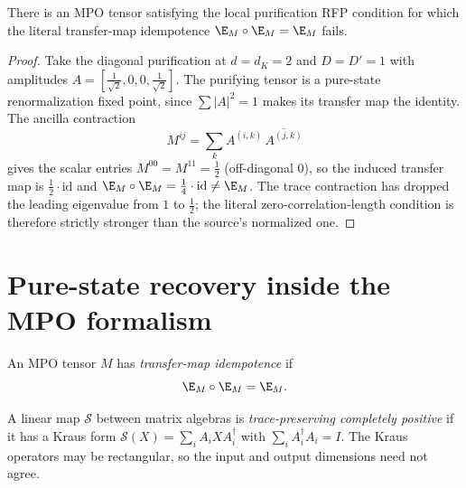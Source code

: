 \begin{theorem}
    \label{thm:local_purification_rfp_not_zcl}
    \leanok
    There is an MPO tensor satisfying the local purification RFP condition for
    which the literal transfer-map idempotence $\E_M\circ\E_M=\E_M$ fails.
\end{theorem}

\begin{proof}\leanok
    Take the diagonal purification at $d=d_K=2$ and $D=D'=1$ with amplitudes
    $A=[\tfrac{1}{\sqrt2},0,0,\tfrac{1}{\sqrt2}]$. The purifying tensor is a
    pure-state renormalization fixed point, since $\sum|A|^2=1$ makes its transfer
    map the identity. The ancilla contraction
    \[
        M^{ij}=\sum_k A^{(i,k)}\,\overline{A^{(j,k)}}
    \]
    gives the scalar entries $M^{00}=M^{11}=\tfrac12$ (off-diagonal $0$), so the
    induced transfer map is $\tfrac12\cdot\mathrm{id}$ and
    $\E_M\circ\E_M=\tfrac14\cdot\mathrm{id}\neq\E_M$. The trace contraction has
    dropped the leading eigenvalue from $1$ to $\tfrac12$; the literal
    zero-correlation-length condition is therefore strictly stronger than the
    source's normalized one.
\end{proof}

\section{Pure-state recovery inside the MPO formalism}

\begin{definition}\label{def:is_rfp_mpdo}
    \leanok
    An MPO tensor $M$ has \emph{transfer-map idempotence} if
    \[
        \E_M \circ \E_M = \E_M.
    \]
\end{definition}


\begin{definition}
    \label{def:is_kraus_cptp}
    \leanok
    A linear map $\mathcal{S}$ between matrix algebras is \emph{trace-preserving
        completely positive} if it has a Kraus form
    $\mathcal{S}(X) = \sum_{i} A_i X A_i^\dagger$ with $\sum_i A_i^\dagger A_i = I$.
    The Kraus operators may be rectangular, so the input and output dimensions
    need not agree.
\end{definition}


